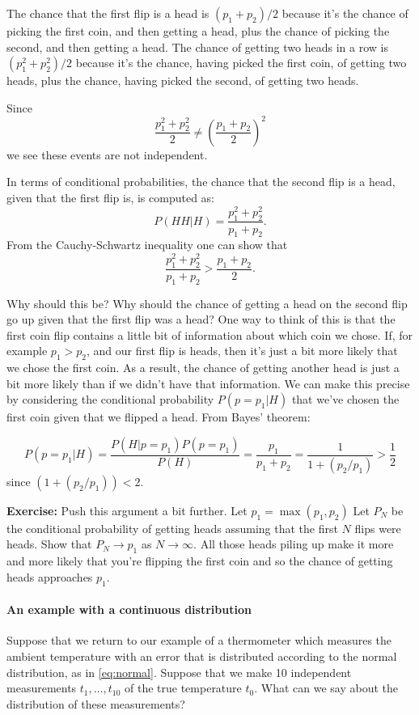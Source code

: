\documentclass[
]{article}
\begin{document}
The chance that the first flip is a head is \((p_1+p_2)/2\) because it's
the chance of picking the first coin, and then getting a head, plus the
chance of picking the second, and then getting a head. The chance of
getting two heads in a row is \((p_1^2+p_2^2)/2\) because it's the
chance, having picked the first coin, of getting two heads, plus the
chance, having picked the second, of getting two heads.

Since \[
\frac{p_1^2+p_2^2}{2}\not=\left(\frac{p_1+p_2}{2}\right)^2
\] we see these events are not independent.

In terms of conditional probabilities, the chance that the second flip
is a head, given that the first flip is, is computed as: \[
P(HH|H) = \frac{p_1^2+p_2^2}{p_1+p_2}.
\] From the Cauchy-Schwartz inequality one can show that \[
\frac{p_1^2+p_2^2}{p_1+p_2}>\frac{p_1+p_2}{2}.
\]

Why should this be? Why should the chance of getting a head on the
second flip go up given that the first flip was a head? One way to think
of this is that the first coin flip contains a little bit of information
about which coin we chose. If, for example \(p_1>p_2\), and our first
flip is heads, then it's just a bit more likely that we chose the first
coin. As a result, the chance of getting another head is just a bit more
likely than if we didn't have that information. We can make this precise
by considering the conditional probability \(P(p=p_1|H)\) that we've
chosen the first coin given that we flipped a head. From Bayes' theorem:

\[
P(p=p_1|H) = \frac{P(H|p=p_1)P(p=p_1)}{P(H)}=\frac{p_1}{p_1+p_2}=\frac{1}{1+(p_2/p_1)}>\frac{1}{2}
\] since \((1+(p_2/p_1))<2\).

\textbf{Exercise:} Push this argument a bit further. Let
\(p_1=\max(p_1,p_2)\) Let \(P_N\) be the conditional probability of
getting heads assuming that the first \(N\) flips were heads. Show that
\(P_N\to p_1\) as \(N\to\infty\). All those heads piling up make it more
and more likely that you're flipping the first coin and so the chance of
getting heads approaches \(p_1\).

\hypertarget{an-example-with-a-continuous-distribution}{%
\paragraph{An example with a continuous
distribution}\label{an-example-with-a-continuous-distribution}}

Suppose that we return to our example of a thermometer which measures
the ambient temperature with an error that is distributed according to
the normal distribution, as in \cref{eq:normal}. Suppose that we make 10
independent measurements \(t_1,\ldots, t_{10}\) of the true temperature
\(t_0\). What can we say about the distribution of these measurements?
\end{document}
